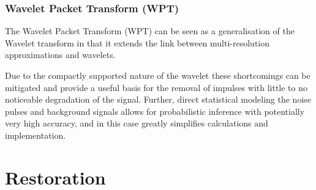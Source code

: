 \subsubsection{Wavelet Packet Transform (WPT)}
The Wavelet Packet Transform (WPT) can be seen as a generalisation of the Wavelet transform in that it extends the link between multi-resolution approximations and wavelets.


%
%


Due to the compactly supported nature of the wavelet \cite{Mallat1999} these shortcomings can be mitigated \cite{Nongpiur2008} and provide a useful basis for the removal of impulses with little to no noticeable degradation of the signal. Further, direct statistical modeling the noise pulses and background signals allows for probabilistic inference \cite{Godsill1998} with potentially very high accuracy, and in this case greatly simplifies calculations and implementation.






\section{Restoration}\label{sec:LitRev_Restoration}
